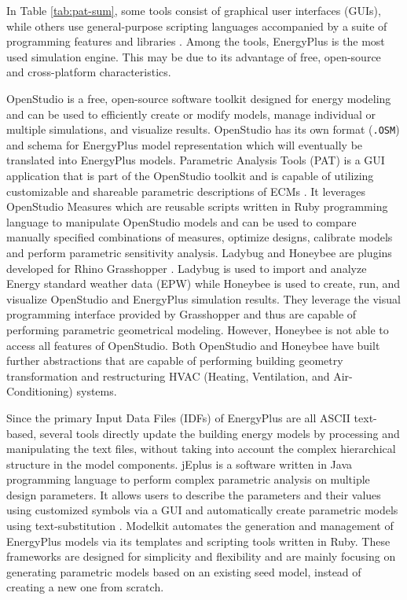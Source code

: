 \documentclass[3p, times]{elsarticle} %
\begin{document}
In Table \ref{tab:pat-sum}, some tools consist of graphical user interfaces
(GUIs), while others use general-purpose scripting languages accompanied by a
suite of programming features and libraries \citep{Roth2018}.
Among the tools, EnergyPlus is the most used simulation engine.
This may be due to its advantage of free, open-source and cross-platform
characteristics.

OpenStudio \citep{Guglielmetti2011} is a free, open-source software toolkit designed
for energy modeling and can be used to efficiently create or modify models,
manage individual or multiple simulations, and visualize results. OpenStudio
has its own format (\texttt{.OSM}) and schema for EnergyPlus model representation
which will eventually be translated into EnergyPlus models. Parametric Analysis
Tools (PAT) is a GUI application that is part of the OpenStudio toolkit and is
capable of utilizing customizable and shareable parametric descriptions of ECMs
\citep{Parker2014}. It leverages OpenStudio Measures which are reusable scripts
written in Ruby programming language to manipulate OpenStudio models and can be
used to compare manually specified combinations of measures, optimize designs,
calibrate models and perform parametric sensitivity analysis.
Ladybug and Honeybee are plugins developed for Rhino Grasshopper
\citep{Roudsari2013, Tabadkani2019}. Ladybug is used to import and analyze Energy
standard weather data (EPW) while Honeybee is used to create, run, and
visualize OpenStudio and EnergyPlus simulation results. They leverage the
visual programming interface provided by Grasshopper and thus are capable of
performing parametric geometrical modeling. However, Honeybee is not able to
access all features of OpenStudio.
Both OpenStudio and Honeybee have built further abstractions that are capable
of performing building geometry transformation and restructuring HVAC (Heating,
Ventilation, and Air-Conditioning) systems.

Since the primary Input Data Files (IDFs) of EnergyPlus are all ASCII
text-based, several tools directly update the building energy models by
processing and manipulating the text files, without taking into account the
complex hierarchical structure in the model components.
jEplus \citep{Yi2020} is a software written in Java programming language to perform
complex parametric analysis on multiple design parameters. It allows users to
describe the parameters and their values using customized symbols via a GUI and
automatically create parametric models using text-substitution \citep{Zhang2010a}.
Modelkit \citep{BigLadderSoftware2020} automates the generation and management of
EnergyPlus models via its templates and scripting tools written in Ruby.
These frameworks are designed for simplicity and flexibility and are mainly
focusing on generating parametric models based on an existing seed model,
instead of creating a new one from scratch.
\end{document}
